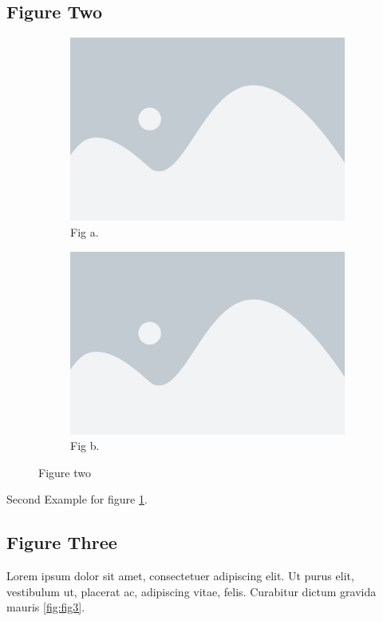 \subsection{Figure Two}
\begin{figure}[!ht]
  \centering
  \begin{subfigure}[b]{0.4\linewidth}
    \includegraphics[width=\linewidth]{../images/fig1.png}
    \caption{Fig a.}
  \end{subfigure}
  \begin{subfigure}[b]{0.4\linewidth}
    \includegraphics[width=\linewidth]{../images/fig1.png}
    \caption{Fig b.}
  \end{subfigure}
  \caption{Figure two}
  \label{fig:figtwo}
\end{figure}
Second Example for figure  \ref{fig:figtwo}.
\lipsum[1-1]

\subsection{Figure Three}
Lorem ipsum dolor sit amet, consectetuer adipiscing elit. Ut purus elit, vestibulum
ut, placerat ac, adipiscing vitae, felis. Curabitur dictum gravida mauris \ref{fig:fig3}.

